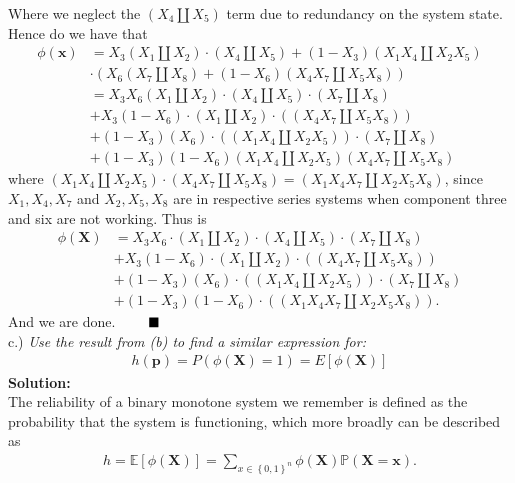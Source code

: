 \documentclass[12pt,
               a4paper,
               article,
               oneside,
               english,oldfontcommands]{memoir}
\newcommand{\Q}{ \qquad \hfill \blacksquare}
\newcommand{\bl}{\left\{}
\newcommand{\br}{\right\}}
\newcommand{\spaze}{\vspace{4mm}\\}
\begin{document}
Where we neglect the $\left(X_4 \coprod X_5 \right) $ term due to redundancy on the system state. Hence do we have that 
\begin{align*}
\phi(\bm{x}) &= X_3 \left( X_1 \coprod X_2 \right) \cdot \left(X_4 \coprod X_5 \right) + (1 - X_3)\left(X_1X_4 \coprod X_2 X_5 \right) \\[8pt]
&\cdot \left( X_6 \left( X_7 \coprod X_8 \right)  + (1 - X_6)\left(X_4X_7 \coprod X_5 X_8 \right) \right) \\[8pt]
&= X_3X_6 \left( X_1 \coprod X_2 \right) \cdot \left(X_4 \coprod X_5 \right) \cdot\left( X_7 \coprod X_8 \right) \\[8pt] 
&+ X_3(1-X_6) \cdot \left( X_1 \coprod X_2 \right) \cdot \left( \left( X_4 X_7 \coprod X_5 X_8 \right) \right) \\[8pt]
&+ (1 - X_3 )(X_6) \cdot \left( \left(X_1X_4 \coprod X_2 X_5 \right) \right) \cdot \left( X_7 \coprod X_8 \right) \\[8pt]
&+ (1 - X_3 )(1 - X_6)  \left(X_1X_4 \coprod X_2 X_5 \right)\left(X_4X_7 \coprod X_5 X_8 \right)
\end{align*}
where $\left(X_1X_4 \coprod X_2 X_5 \right) \cdot \left(X_4X_7 \coprod X_5 X_8 \right) =  \left(X_1X_4X_7 \coprod X_2 X_5 X_8 \right) $, since $X_1, X_4, X_7$ and $X_2, X_5, X_8$ are in respective series systems when component three and six are not working. Thus is 
\begin{align*}
\phi(\bm{X}) &= X_3 X_6 \cdot \left( X_1 \coprod X_2 \right) \cdot \left(X_4 \coprod X_5 \right)\cdot \left(X_7 \coprod X_8 \right) \\[5pt]
&+ X_3 (1- X_6) \cdot \left( X_1 \coprod X_2 \right) \cdot \left( \left( X_4 X_7 \coprod X_5 X_8 \right) \right) \\[5pt]
&+ (1 - X_3 )(X_6) \cdot \left( \left(X_1X_4 \coprod X_2 X_5 \right) \right) \cdot \left( X_7 \coprod X_8 \right) \\[5pt]
&+ (1 - X_3 )(1 - X_6) \cdot \left( \left(X_1X_4X_7 \coprod X_2 X_5 X_8 \right) \right).
\end{align*}
And we are done. $\Q$ \spaze
c.) \emph{Use the result from (b) to find a similar expression for:}
\begin{align*}
h(\bm{p}) = P(\phi(\bm{X}) = 1) = E[\phi(\bm{X})]
\end{align*}
\textbf{Solution:}\spaze 
The reliability of a binary monotone system we remember is defined as the probability that the system is functioning, which more broadly can be described as 
\begin{align*}
h = \mathbb{E}[\phi(\bm{X})] = \sum_{x \in \bl 0,1 \br^n} \phi(\bm{X})\mathbb{P}( \bm{X} = \bm{x}).
\end{align*}
\end{document}
